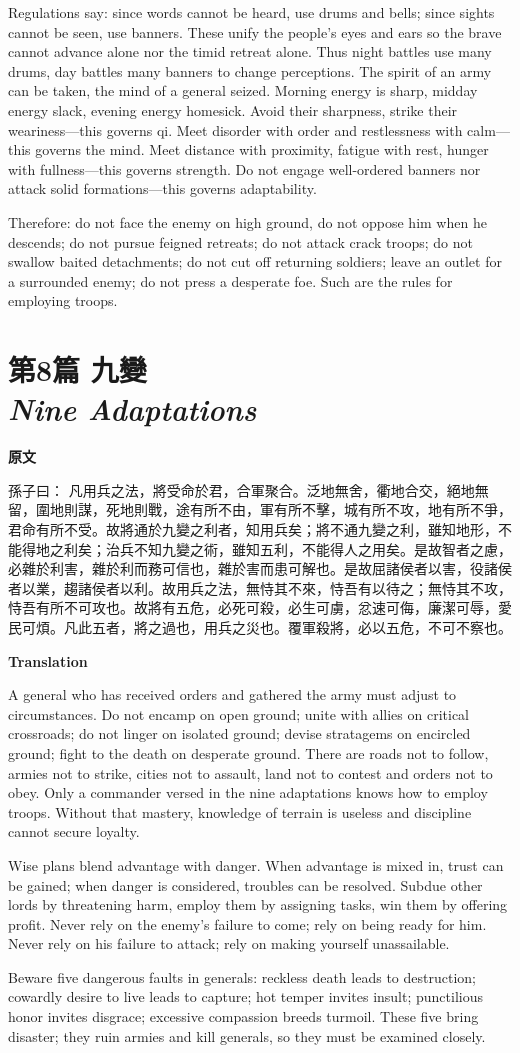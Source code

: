 \documentclass[12pt]{book}
\newcommand{\chapterentry}[4]{%
  \chapter[\texorpdfstring{#1}{#1}]{\texorpdfstring{#1\\\Large\textit{#2}}{#1 — #2}}%
  \noindent\textbf{原文}\par
  #3

  \bigskip
  \noindent\textbf{Translation}\par
  #4
}
\begin{document}
{Regulations say: since words cannot be heard, use drums and bells; since sights cannot be seen, use banners. These unify the people’s eyes and ears so the brave cannot advance alone nor the timid retreat alone. Thus night battles use many drums, day battles many banners to change perceptions. The spirit of an army can be taken, the mind of a general seized. Morning energy is sharp, midday energy slack, evening energy homesick. Avoid their sharpness, strike their weariness—this governs qi. Meet disorder with order and restlessness with calm—this governs the mind. Meet distance with proximity, fatigue with rest, hunger with fullness—this governs strength. Do not engage well-ordered banners nor attack solid formations—this governs adaptability.

Therefore: do not face the enemy on high ground, do not oppose him when he descends; do not pursue feigned retreats; do not attack crack troops; do not swallow baited detachments; do not cut off returning soldiers; leave an outlet for a surrounded enemy; do not press a desperate foe. Such are the rules for employing troops.}

\chapterentry{第8篇 九變}{Nine Adaptations}{%
孫子曰： 凡用兵之法，將受命於君，合軍聚合。泛地無舍，衢地合交，絕地無留，圍地則謀，死地則戰，途有所不由，軍有所不擊，城有所不攻，地有所不爭，君命有所不受。故將通於九變之利者，知用兵矣；將不通九變之利，雖知地形，不能得地之利矣；治兵不知九變之術，雖知五利，不能得人之用矣。是故智者之慮，必雜於利害，雜於利而務可信也，雜於害而患可解也。是故屈諸侯者以害，役諸侯者以業，趨諸侯者以利。故用兵之法，無恃其不來，恃吾有以待之；無恃其不攻，恃吾有所不可攻也。故將有五危，必死可殺，必生可虜，忿速可侮，廉潔可辱，愛民可煩。凡此五者，將之過也，用兵之災也。覆軍殺將，必以五危，不可不察也。}{%
A general who has received orders and gathered the army must adjust to circumstances. Do not encamp on open ground; unite with allies on critical crossroads; do not linger on isolated ground; devise stratagems on encircled ground; fight to the death on desperate ground. There are roads not to follow, armies not to strike, cities not to assault, land not to contest and orders not to obey. Only a commander versed in the nine adaptations knows how to employ troops. Without that mastery, knowledge of terrain is useless and discipline cannot secure loyalty.

Wise plans blend advantage with danger. When advantage is mixed in, trust can be gained; when danger is considered, troubles can be resolved. Subdue other lords by threatening harm, employ them by assigning tasks, win them by offering profit. Never rely on the enemy’s failure to come; rely on being ready for him. Never rely on his failure to attack; rely on making yourself unassailable.

Beware five dangerous faults in generals: reckless death leads to destruction; cowardly desire to live leads to capture; hot temper invites insult; punctilious honor invites disgrace; excessive compassion breeds turmoil. These five bring disaster; they ruin armies and kill generals, so they must be examined closely.}
\end{document}
